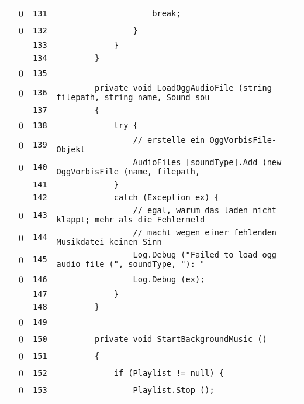 \documentclass[a4paper,10pt]{article}
\begin{document}
\begin{longtable}[l]{lrrl}
\cellcolor{red} & 0 & \verb~131~ & \verb~                    break;~\\
\cellcolor{red} & 0 & \verb~132~ & \verb~                }~\\
\cellcolor{gray} &  & \verb~133~ & \verb~            }~\\
\cellcolor{gray} &  & \verb~134~ & \verb~        }~\\
\cellcolor{red} & 0 & \verb~135~ & \verb~~\\
\cellcolor{red} & 0 & \verb~136~ & \verb~        private void LoadOggAudioFile (string filepath, string name, Sound sou~\\
\cellcolor{gray} &  & \verb~137~ & \verb~        {~\\
\cellcolor{red} & 0 & \verb~138~ & \verb~            try {~\\
\cellcolor{red} & 0 & \verb~139~ & \verb~                // erstelle ein OggVorbisFile-Objekt~\\
\cellcolor{red} & 0 & \verb~140~ & \verb~                AudioFiles [soundType].Add (new OggVorbisFile (name, filepath,~\\
\cellcolor{gray} &  & \verb~141~ & \verb~            }~\\
\cellcolor{gray} &  & \verb~142~ & \verb~            catch (Exception ex) {~\\
\cellcolor{red} & 0 & \verb~143~ & \verb~                // egal, warum das laden nicht klappt; mehr als die Fehlermeld~\\
\cellcolor{red} & 0 & \verb~144~ & \verb~                // macht wegen einer fehlenden Musikdatei keinen Sinn~\\
\cellcolor{red} & 0 & \verb~145~ & \verb~                Log.Debug ("Failed to load ogg audio file (", soundType, "): "~\\
\cellcolor{red} & 0 & \verb~146~ & \verb~                Log.Debug (ex);~\\
\cellcolor{gray} &  & \verb~147~ & \verb~            }~\\
\cellcolor{gray} &  & \verb~148~ & \verb~        }~\\
\cellcolor{red} & 0 & \verb~149~ & \verb~~\\
\cellcolor{red} & 0 & \verb~150~ & \verb~        private void StartBackgroundMusic ()~\\
\cellcolor{red} & 0 & \verb~151~ & \verb~        {~\\
\cellcolor{red} & 0 & \verb~152~ & \verb~            if (Playlist != null) {~\\
\cellcolor{red} & 0 & \verb~153~ & \verb~                Playlist.Stop ();~\\

\end{longtable}
\end{document}

